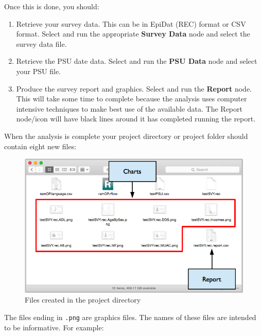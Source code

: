 \documentclass[12pt,a4paper]{book}
\theoremstyle{definition}
\theoremstyle{definition}
\theoremstyle{definition}
\theoremstyle{remark}
\begin{document}
Once this is done, you should:

\begin{enumerate}
\def\labelenumi{\arabic{enumi}.}
\item
  Retrieve your survey data. This can be in EpiDat (REC) format or CSV
  format. Select and run the appropriate \textbf{Survey Data} node and
  select the survey data file.
\item
  Retrieve the PSU date data. Select and run the \textbf{PSU Data} node
  and select your PSU file.
\item
  Produce the survey report and graphics. Select and run the
  \textbf{Report} node. This will take some time to complete because the
  analysis uses computer intensive techniques to make best use of the
  available data. The Report node/icon will have black lines around it
  has completed running the report.
\end{enumerate}

When the analysis is complete your project directory or project folder
should contain eight new files:

\begin{figure}[H]

{\centering \includegraphics[width=800pt]{figures/workflowResults01} 

}

\caption{Files created in the project directory}\label{fig:raf5}
\end{figure}

The files ending in \texttt{.png} are graphics files. The names of these
files are intended to be informative. For example:
\end{document}
